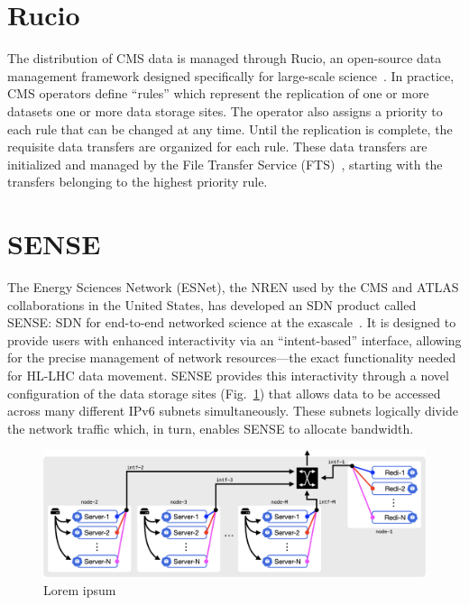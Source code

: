 \section{Rucio}
The distribution of CMS data is managed through Rucio, an open-source data management framework designed specifically for large-scale science~\cite{Rucio2019}. 
In practice, CMS operators define ``rules'' which represent the replication of one or more datasets one or more data storage sites. 
The operator also assigns a priority to each rule that can be changed at any time. 
Until the replication is complete, the requisite data transfers are organized for each rule. 
These data transfers are initialized and managed by the File Transfer Service (FTS)~\cite{FTS3}, starting with the transfers belonging to the highest priority rule. 

\section{SENSE}
The Energy Sciences Network (ESNet), the NREN used by the CMS and ATLAS collaborations in the United States, has developed an SDN product called SENSE: SDN for end-to-end networked science at the exascale~\cite{SENSE}. 
It is designed to provide users with enhanced interactivity via an ``intent-based'' interface, allowing for the precise management of network resources---the exact functionality needed for HL-LHC data movement. 
SENSE provides this interactivity through a novel configuration of the data storage sites (Fig.~\ref{fig:sense_site}) that allows data to be accessed across many different IPv6 subnets simultaneously. 
These subnets logically divide the network traffic which, in turn, enables SENSE to allocate bandwidth. 

\begin{figure}[htb]
  \centering
  \includegraphics[width=.9\textwidth]{fig/cyber/rucio-sense_site.png}
  \caption{Lorem ipsum}
  \label{fig:sense_site}
\end{figure}


